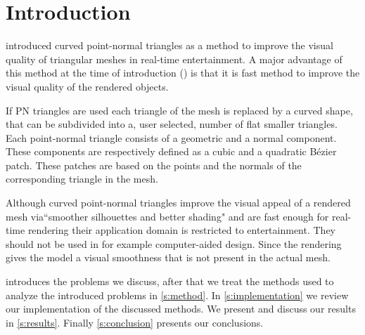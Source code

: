 
\section{Introduction}
\label{s:introduction}

\textcite{vlachos2001curved} introduced curved point-normal triangles as a method to improve the visual quality of triangular meshes in real-time entertainment. A major advantage of this method at the time of introduction (\citeyear{vlachos2001curved}) is that it is fast method to improve the visual quality of the rendered objects.

If PN triangles are used each triangle of the mesh is replaced by a curved shape, that can be subdivided into a, user selected, number of flat smaller triangles. Each point-normal triangle consists of a geometric and a normal component. These components are respectively defined as a cubic and a quadratic Bézier patch. These patches are based on the points and the normals of the corresponding triangle in the mesh. 


Although curved point-normal triangles improve the visual appeal of a rendered mesh via``smoother silhouettes and better shading" \cite{vlachos2001curved} and are fast enough for real-time rendering their application domain is restricted to entertainment. They should not be used in for example computer-aided design. Since the rendering gives the model a visual smoothness that is not present in the actual mesh. 


 introduces the problems we discuss, after that we treat the methods used to analyze the introduced problems in \cref{s:method}. In \cref{s:implementation} we review our implementation of the discussed methods. We present and discuss our results in \cref{s:results}. Finally \cref{s:conclusion} presents our conclusions. 



